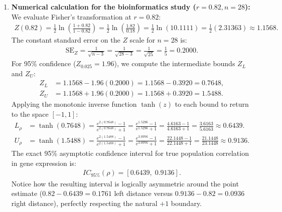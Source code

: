 \begin{solproblema}
\begin{enumerate}
		\item \textbf{Numerical calculation for the bioinformatics study ($r = 0.82, n = 28$):}
		We evaluate Fisher's transformation at $r = 0.82$:
		\begin{align}
			Z(0.82) = \frac{1}{2} \ln\left( \frac{1 + 0.82}{1 - 0.82} \right) = \frac{1}{2} \ln\left( \frac{1.82}{0.18} \right) = \frac{1}{2} \ln(10.1111) = \frac{1}{2}(2.31363) \approx 1.1568.
		\end{align}
		The constant standard error on the $Z$ scale for $n = 28$ is:
		\begin{align}
			\text{SE}_Z = \frac{1}{\sqrt{n - 3}} = \frac{1}{\sqrt{28 - 3}} = \frac{1}{\sqrt{25}} = \frac{1}{5} = 0.2000.
		\end{align}
		For 95\% confidence ($Z_{0.025} = 1.96$), we compute the intermediate bounds $Z_L$ and $Z_U$:
		\begin{align}
			Z_L &= 1.1568 - 1.96(0.2000) = 1.1568 - 0.3920 = 0.7648, \\
			Z_U &= 1.1568 + 1.96(0.2000) = 1.1568 + 0.3920 = 1.5488.
		\end{align}
		Applying the monotonic inverse function $\tanh(z)$ to each bound to return to the space $[-1, 1]$:
		\begin{align}
			L_\rho &= \tanh(0.7648) = \frac{e^{2(0.7648)} - 1}{e^{2(0.7648)} + 1} = \frac{e^{1.5296} - 1}{e^{1.5296} + 1} = \frac{4.6163 - 1}{4.6163 + 1} = \frac{3.6163}{5.6163} \approx 0.6439. \\
			U_\rho &= \tanh(1.5488) = \frac{e^{2(1.5488)} - 1}{e^{2(1.5488)} + 1} = \frac{e^{3.0976} - 1}{e^{3.0976} + 1} = \frac{22.1448 - 1}{22.1448 + 1} = \frac{21.1448}{23.1448} \approx 0.9136.
		\end{align}
		The exact 95\% asymptotic confidence interval for true population correlation in gene expression is:
		\begin{align}
			IC_{95\%}(\rho) = [0.6439, \; 0.9136].
		\end{align}
		Notice how the resulting interval is logically asymmetric around the point estimate ($0.82 - 0.6439 = 0.1761$ left distance versus $0.9136 - 0.82 = 0.0936$ right distance), perfectly respecting the natural $+1$ boundary.
	\end{enumerate}
\end{solproblema}

